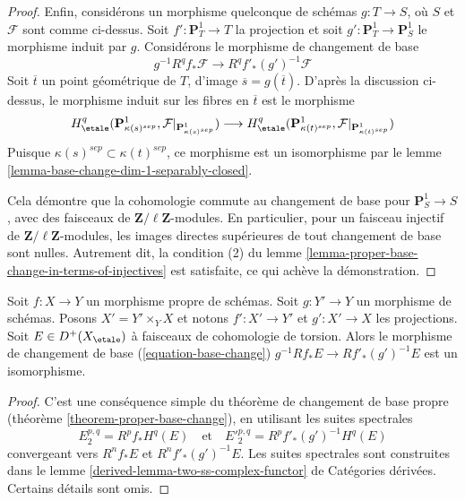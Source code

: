 \begin{proof}
\medskip\noindent
Enfin, considérons un morphisme quelconque de schémas $g : T \to S$, où
$S$ et $\mathcal{F}$ sont comme ci-dessus.
Soit $f' : \mathbf{P}^1_T \to T$ la projection et soit
$g' : \mathbf{P}^1_T \to \mathbf{P}^1_S$ le morphisme induit
par $g$. Considérons le morphisme de changement de base
$$
g^{-1}R^qf_*\mathcal{F}
\longrightarrow
R^qf'_*(g')^{-1}\mathcal{F}
$$
Soit $\overline{t}$ un point géométrique de $T$, d'image
$\overline{s} = g(\overline{t})$. D'après la discussion
ci-dessus, le morphisme induit sur les fibres en $\overline{t}$ est le morphisme
$$
H^q_\etale(\mathbf{P}^1_{\kappa(s)^{sep}},
\mathcal{F}|_{\mathbf{P}^1_{\kappa(s)^{sep}}})
\longrightarrow
H^q_\etale(\mathbf{P}^1_{\kappa(t)^{sep}},
\mathcal{F}|_{\mathbf{P}^1_{\kappa(t)^{sep}}})
$$
Puisque $\kappa(s)^{sep} \subset \kappa(t)^{sep}$, ce morphisme est un
isomorphisme par le lemme \ref{lemma-base-change-dim-1-separably-closed}.

\medskip\noindent
Cela démontre que la cohomologie commute au changement de base pour
$\mathbf{P}^1_S \to S$, avec des faisceaux de $\mathbf{Z}/\ell\mathbf{Z}$-modules.
En particulier, pour un faisceau injectif de $\mathbf{Z}/\ell\mathbf{Z}$-modules,
les images directes supérieures de tout changement de base sont nulles.
Autrement dit, la condition (2) du
lemme \ref{lemma-proper-base-change-in-terms-of-injectives}
est satisfaite, ce qui achève la démonstration.
\end{proof}

\begin{lemma}
\label{lemma-proper-base-change}
Soit $f : X \to Y$ un morphisme propre de schémas. Soit $g : Y' \to Y$
un morphisme de schémas. Posons $X' = Y' \times_Y X$ et notons
$f' : X' \to Y'$ et $g' : X' \to X$ les projections.
Soit $E \in D^+(X_\etale)$ à faisceaux de cohomologie de torsion.
Alors le morphisme de changement de base (\ref{equation-base-change})
$g^{-1}Rf_*E \to Rf'_*(g')^{-1}E$
est un isomorphisme.
\end{lemma}

\begin{proof}
C'est une conséquence simple du théorème de changement de base propre
(théorème \ref{theorem-proper-base-change}), en utilisant les suites
spectrales
$$
E_2^{p, q} = R^pf_*H^q(E)
\quad\text{et}\quad
{E'}_2^{p, q} = R^pf'_*(g')^{-1}H^q(E)
$$
convergeant vers $R^nf_*E$ et $R^nf'_*(g')^{-1}E$.
Les suites spectrales sont construites dans le
lemme \ref{derived-lemma-two-ss-complex-functor} de Catégories dérivées.
Certains détails sont omis.
\end{proof}

